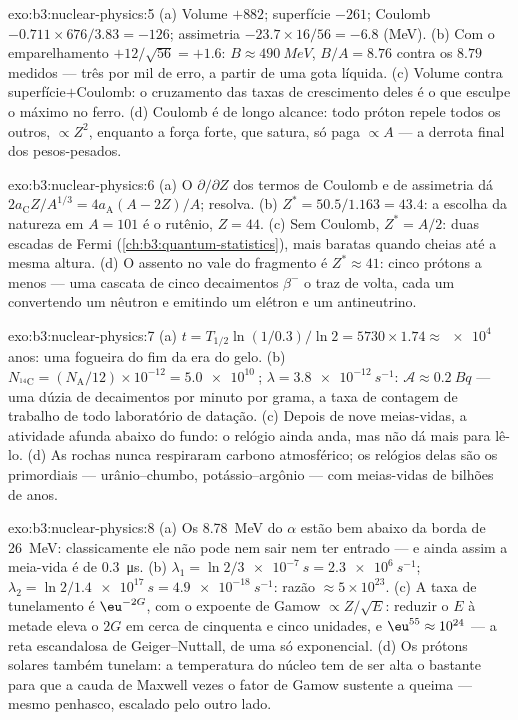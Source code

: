 \begin{solution}{exo:b3:nuclear-physics:5}
(a) Volume $+882$; superfície $-261$; Coulomb $-0.711\times676/3.83
= -126$; assimetria $-23.7\times16/56 = -6.8$ (\unit{MeV}). (b)
Com o emparelhamento $+12/\sqrt{56} = +1.6$: $B \approx \qty{490}{MeV}$,
$B/A = 8.76$ contra os $8.79$ medidos --- três por mil
de erro, a partir de uma gota líquida. (c) Volume contra
superfície$+$Coulomb: o cruzamento das taxas de crescimento deles é o
que esculpe o máximo no ferro.
(d) Coulomb é de longo alcance: todo próton repele todos os outros,
$\propto Z^2$, enquanto a força forte, que satura, só paga
$\propto A$ --- a derrota final dos pesos-pesados.
\end{solution}

\begin{solution}{exo:b3:nuclear-physics:6}
(a) O $\partial/\partial Z$ dos termos de Coulomb e de assimetria
dá $2a_{\text{C}}Z/A^{1/3} = 4a_{\text{A}}(A - 2Z)/A$; resolva.
(b) $Z^* = 50.5/1.163 = 43.4$: a escolha da natureza em $A = 101$ é o
rutênio, $Z = 44$. (c) Sem Coulomb, $Z^* = A/2$: duas escadas de
Fermi (\cref{ch:b3:quantum-statistics}), mais baratas quando cheias
até a mesma altura. (d) O assento no vale do fragmento é $Z^* \approx 41$:
cinco prótons a menos --- uma cascata de cinco decaimentos $\beta^-$ o
traz de volta, cada um convertendo um nêutron e emitindo um elétron e um
antineutrino.
\end{solution}

\begin{solution}{exo:b3:nuclear-physics:7}
(a) $t = T_{1/2}\ln(1/0.3)/\ln2 = 5730\times1.74 \approx
\qty{e4}{}$ anos: uma fogueira do fim da era do gelo. (b) $N_{^{14}\text{C}}
= (N_{\text{A}}/12)\times10^{-12} = \qty{5.0e10}{}$; $\lambda =
\qty{3.8e-12}{s^{-1}}$: $\mathcal A \approx \qty{0.2}{Bq}$ ---
uma dúzia de decaimentos por minuto por grama, a taxa de contagem de
trabalho de todo laboratório de datação. (c) Depois de nove meias-vidas,
a atividade afunda abaixo do fundo: o relógio ainda anda, mas não dá mais
para lê-lo. (d) As rochas nunca respiraram carbono atmosférico; os
relógios delas são os primordiais --- urânio--chumbo,
potássio--argônio --- com meias-vidas de bilhões de anos.
\end{solution}

\begin{solution}{exo:b3:nuclear-physics:8}
(a) Os \qty{8.78}{MeV} do $\alpha$ estão bem abaixo da borda de
\qty{26}{MeV}: classicamente ele não pode nem sair nem ter
entrado --- e ainda assim a meia-vida é de \qty{0.3}{\micro s}. (b)
$\lambda_1 = \ln2/\qty{3e-7}{s} = \qty{2.3e6}{s^{-1}}$;
$\lambda_2 = \ln2/\qty{1.4e17}{s} = \qty{4.9e-18}{s^{-1}}$:
razão $\approx 5\times10^{23}$. (c) A taxa de tunelamento é
$\eu^{-2G}$, com o expoente de Gamow $\propto Z/\sqrt E$:
reduzir o $E$ à metade eleva o $2G$ em cerca de cinquenta e cinco
unidades, e $\eu^{55} \approx 10^{24}$ --- a reta escandalosa de
Geiger--Nuttall, de uma só exponencial. (d) Os prótons solares também
tunelam: a temperatura do núcleo tem de ser alta o bastante para que a
cauda de Maxwell vezes o fator de Gamow sustente a queima ---
mesmo penhasco, escalado pelo outro lado.
\end{solution}

